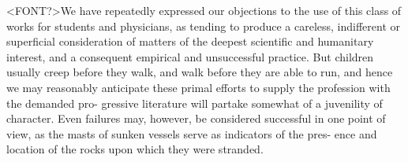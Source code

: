 <FONT?>We have repeatedly expressed our objections to the use of this class
of works for students and physicians, as tending to produce a careless,
indifferent or superficial consideration of matters of the deepest scientific
and humanitary interest, and a consequent empirical and unsuccessful
practice. But children usually creep before they walk, and walk
before they are able to run, and hence we may reasonably anticipate
these primal efforts to supply the profession with the demanded pro-
gressive literature will partake somewhat of a juvenility of character.
Even failures may, however, be considered successful in one point of
view, as the masts of sunken vessels serve as indicators of the pres-
ence and location of the rocks upon which they were stranded.\endinput
